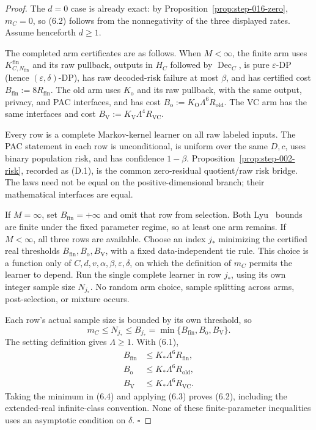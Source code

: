 \begin{proof}
The \(d=0\) case is already exact: by
Proposition~\ref{prop:step-016-zero}, \(m_C=0\), so (6.2) follows from the
nonnegativity of the three displayed rates. Assume henceforth \(d\ge1\).

The completed arm certificates are as follows. When \(M<\infty\), the finite
arm uses \(K^{\mathrm{fin}}_{C,N_{\mathrm{fin}}}\) and its raw pullback,
outputs in \(H_C\) followed by \(\operatorname{Dec}_C\), is pure
\(\varepsilon\)-DP (hence \((\varepsilon,\delta)\)-DP), has raw decoded-risk
failure at most \(\beta\), and has certified cost
\(B_{\mathrm{fin}}:=8R_{\mathrm{fin}}\). The old arm uses \(K_{\mathrm o}\)
and its raw pullback, with the same output, privacy, and PAC interfaces, and
has cost \(B_{\mathrm o}:=K_{\mathrm O}\Lambda^6R_{\mathrm{old}}\). The
VC arm has the same interfaces and cost
\(B_{\mathrm V}:=K_{\mathrm V}\Lambda^4R_{\mathrm{VC}}\).

Every row is a complete Markov-kernel learner on all raw labeled inputs. The
PAC statement in each row is unconditional, is uniform over the same
\(D,c\), uses binary population risk, and has confidence \(1-\beta\).
Proposition~\ref{prop:step-002-risk}, recorded as (D.1), is the
common zero-residual quotient/raw risk bridge. The laws need not be equal on
the positive-dimensional branch; their mathematical interfaces are equal.

If \(M=\infty\), set \(B_{\mathrm{fin}}=+\infty\) and omit that row from
selection. Both Lyu~\citep{lyu2025} bounds are finite under the fixed parameter regime, so at
least one arm remains. If \(M<\infty\), all three rows are available. Choose
an index \(j_*\) minimizing the certified real thresholds
\(B_{\mathrm{fin}},B_{\mathrm o},B_{\mathrm V}\), with a fixed
data-independent tie rule. This choice is a function only of
\(C,d,v,\alpha,\beta,\varepsilon,\delta\), on which the definition of
\(m_C\) permits the learner to depend. Run the single complete learner in
row \(j_*\), using its own integer sample size \(N_{j_*}\). No random arm
choice, sample splitting across arms, post-selection, or mixture occurs.

Each row's actual sample size is bounded by its own threshold, so
\[
m_C\le N_{j_*}\le B_{j_*}
=\min\{B_{\mathrm{fin}},B_{\mathrm o},B_{\mathrm V}\}.
\tag{6.3}
\]
The setting definition gives \(\Lambda\ge1\). With (6.1),
\[
\begin{aligned}
B_{\mathrm{fin}}&\le K_*\Lambda^6R_{\mathrm{fin}},\\
B_{\mathrm o}&\le K_*\Lambda^6R_{\mathrm{old}},\\
B_{\mathrm V}&\le K_*\Lambda^6R_{\mathrm{VC}}.
\end{aligned}
\tag{6.4}
\]
Taking the minimum in (6.4) and applying (6.3) proves (6.2), including the
extended-real infinite-class convention. None of these finite-parameter
inequalities uses an asymptotic condition on \(\delta\). \(\square\)


\end{proof}

